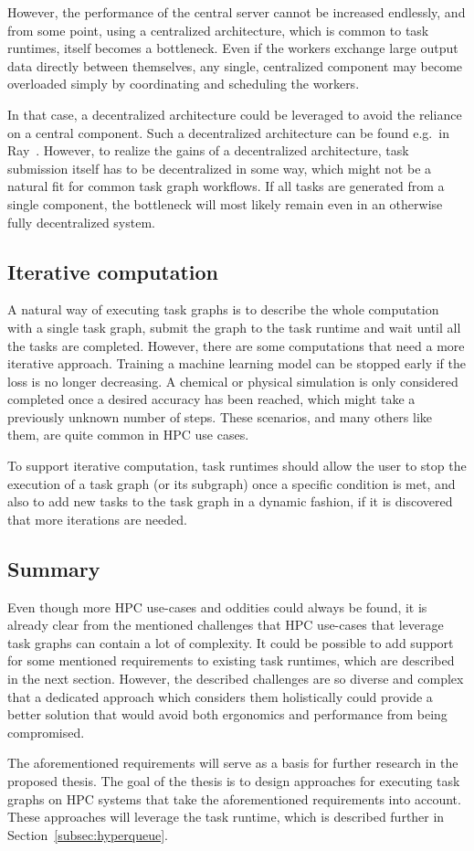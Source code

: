 \begin{description}
    However, the performance of the central server cannot be increased endlessly, and from some
    point, using a centralized architecture, which is common to task runtimes, itself becomes a
    bottleneck. Even if the workers exchange large output data directly between themselves, any
    single, centralized component may become overloaded simply by coordinating and scheduling
    the workers.

    In that case, a decentralized architecture could be leveraged to avoid the reliance on a
    central component. Such a decentralized architecture can be found e.g.\ in Ray~\cite{ray}.
    However, to realize the gains of a decentralized architecture, task submission itself has to
    be decentralized in some way, which might not be a natural fit for common task graph workflows.
    If all tasks are generated from a single component, the bottleneck will most likely remain
    even in an otherwise fully decentralized system.
\end{description}

\subsection{Iterative computation}
A natural way of executing task graphs is to describe the whole computation with a single task
graph, submit the graph to the task runtime and wait until all the tasks are completed. However,
there are some computations that need a more iterative approach. Training a machine
learning model can be stopped early if the loss is no longer decreasing. A chemical or physical
simulation is only considered completed once a desired accuracy has been reached, which might
take a previously unknown number of steps. These scenarios, and many others like them, are quite
common in HPC use cases.

To support iterative computation, task runtimes should allow the user to stop the execution of a
task graph (or its subgraph) once a specific condition is met, and also to add new tasks to the
task graph in a dynamic fashion, if it is discovered that more iterations are needed.

\subsection{Summary}
Even though more HPC use-cases and oddities could always be found, it is already clear from the
mentioned challenges that HPC use-cases that leverage task graphs can contain a lot of complexity.
It could be possible to add support for some mentioned requirements to existing task
runtimes, which are described in the next section. However, the described challenges are so
diverse and complex that a dedicated approach which considers them holistically could provide a
better solution that would avoid both ergonomics and performance from being compromised.

The aforementioned requirements will serve as a basis for further research in the
proposed thesis. The goal of the thesis is to design approaches for executing task
graphs on HPC systems that take the aforementioned requirements into account.
These approaches will leverage the \hyperqueue{} task runtime, which is described
further in Section~\ref{subsec:hyperqueue}.
